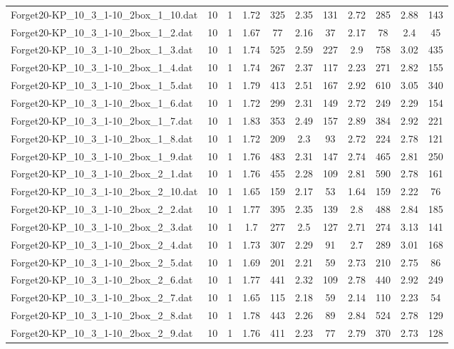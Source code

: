 \begin{table}[!ht]
\begin{tabular}{lcccccccccc}
Forget20-KP\_10\_3\_1-10\_2box\_1\_10.dat & 10 & 1 & 1.72 & 325 & 2.35 & 131 & 2.72 & 285 & 2.88 & 143 \\
Forget20-KP\_10\_3\_1-10\_2box\_1\_2.dat & 10 & 1 & 1.67 & 77 & 2.16 & 37 & 2.17 & 78 & 2.4 & 45 \\
Forget20-KP\_10\_3\_1-10\_2box\_1\_3.dat & 10 & 1 & 1.74 & 525 & 2.59 & 227 & 2.9 & 758 & 3.02 & 435 \\
Forget20-KP\_10\_3\_1-10\_2box\_1\_4.dat & 10 & 1 & 1.74 & 267 & 2.37 & 117 & 2.23 & 271 & 2.82 & 155 \\
Forget20-KP\_10\_3\_1-10\_2box\_1\_5.dat & 10 & 1 & 1.79 & 413 & 2.51 & 167 & 2.92 & 610 & 3.05 & 340 \\
Forget20-KP\_10\_3\_1-10\_2box\_1\_6.dat & 10 & 1 & 1.72 & 299 & 2.31 & 149 & 2.72 & 249 & 2.29 & 154 \\
Forget20-KP\_10\_3\_1-10\_2box\_1\_7.dat & 10 & 1 & 1.83 & 353 & 2.49 & 157 & 2.89 & 384 & 2.92 & 221 \\
Forget20-KP\_10\_3\_1-10\_2box\_1\_8.dat & 10 & 1 & 1.72 & 209 & 2.3 & 93 & 2.72 & 224 & 2.78 & 121 \\
Forget20-KP\_10\_3\_1-10\_2box\_1\_9.dat & 10 & 1 & 1.76 & 483 & 2.31 & 147 & 2.74 & 465 & 2.81 & 250 \\
Forget20-KP\_10\_3\_1-10\_2box\_2\_1.dat & 10 & 1 & 1.76 & 455 & 2.28 & 109 & 2.81 & 590 & 2.78 & 161 \\
Forget20-KP\_10\_3\_1-10\_2box\_2\_10.dat & 10 & 1 & 1.65 & 159 & 2.17 & 53 & 1.64 & 159 & 2.22 & 76 \\
Forget20-KP\_10\_3\_1-10\_2box\_2\_2.dat & 10 & 1 & 1.77 & 395 & 2.35 & 139 & 2.8 & 488 & 2.84 & 185 \\
Forget20-KP\_10\_3\_1-10\_2box\_2\_3.dat & 10 & 1 & 1.7 & 277 & 2.5 & 127 & 2.71 & 274 & 3.13 & 141 \\
Forget20-KP\_10\_3\_1-10\_2box\_2\_4.dat & 10 & 1 & 1.73 & 307 & 2.29 & 91 & 2.7 & 289 & 3.01 & 168 \\
Forget20-KP\_10\_3\_1-10\_2box\_2\_5.dat & 10 & 1 & 1.69 & 201 & 2.21 & 59 & 2.73 & 210 & 2.75 & 86 \\
Forget20-KP\_10\_3\_1-10\_2box\_2\_6.dat & 10 & 1 & 1.77 & 441 & 2.32 & 109 & 2.78 & 440 & 2.92 & 249 \\
Forget20-KP\_10\_3\_1-10\_2box\_2\_7.dat & 10 & 1 & 1.65 & 115 & 2.18 & 59 & 2.14 & 110 & 2.23 & 54 \\
Forget20-KP\_10\_3\_1-10\_2box\_2\_8.dat & 10 & 1 & 1.78 & 443 & 2.26 & 89 & 2.84 & 524 & 2.78 & 129 \\
Forget20-KP\_10\_3\_1-10\_2box\_2\_9.dat & 10 & 1 & 1.76 & 411 & 2.23 & 77 & 2.79 & 370 & 2.73 & 128 \\

\end{tabular}
\end{table}
